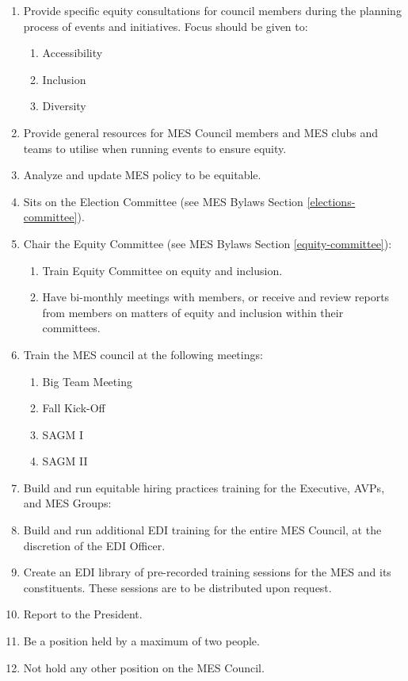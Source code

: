 \begin{enumerate}
 \item
  Provide specific equity consultations for council members during the planning process of events and initiatives. Focus should be given to:

  \begin{enumerate}
   \item
    Accessibility
   \item
    Inclusion
   \item
    Diversity
  \end{enumerate}
 \item
  Provide general resources for MES Council members and MES clubs and teams to utilise when running events to ensure equity.
 \item
  Analyze and update MES policy to be equitable.
 \item
  Sits on the Election Committee (see MES Bylaws Section \ref{elections-committee}).
 \item
  Chair the Equity Committee (see MES Bylaws Section \ref{equity-committee}):

  \begin{enumerate}
   \item
    Train Equity Committee on equity and inclusion.
   \item
    Have bi-monthly meetings with members, or receive and review reports from members on matters of equity and inclusion within their committees.
  \end{enumerate}
 \item
  Train the MES council at the following meetings:

  \begin{enumerate}
   \item
    Big Team Meeting
   \item
    Fall Kick-Off
   \item
    SAGM I
   \item
    SAGM II
  \end{enumerate}
 \item
  Build and run equitable hiring practices training for the Executive, AVPs, and MES Groups:
 \item
  Build and run additional EDI training for the entire MES Council, at the discretion of the EDI Officer.
 \item
  Create an EDI library of pre-recorded training sessions for the MES and its constituents. These sessions are to be distributed upon request.
 \item
  Report to the President.
 \item
  Be a position held by a maximum of two people.
 \item
  Not hold any other position on the MES Council.

\end{enumerate}

